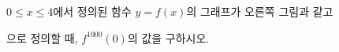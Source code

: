 \noindent\begin{minipage}[t]{0.58\linewidth}\vspace{0pt}\raggedright $0\le x\le 4$에서 정의된 함수 $y=f(x)$의 그래프가 오른쪽 그림과 같고\par\smallskip\end{minipage}\hfill\begin{minipage}[t]{0.4\linewidth}\vspace{0pt}\centering \resizebox{\ifdim\width>\linewidth\linewidth\else\width\fi}{!}{}\end{minipage}\par
\noindent {}\par\smallskip\noindent 으로 정의할 때, $f^{1000}(0)$의 값을 구하시오.
